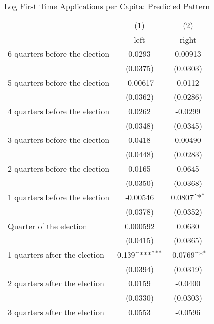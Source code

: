\begin{table}[htbp]\centering
\def\sym#1{\ifmmode^{#1}\else\(^{#1}\)\fi}
\caption{Log First Time Applications per Capita: Predicted Pattern}
\begin{tabular}{l*{2}{c}}
\hline\hline
                    &\multicolumn{1}{c}{(1)}&\multicolumn{1}{c}{(2)}\\
                    &\multicolumn{1}{c}{left}&\multicolumn{1}{c}{right}\\
\hline
 6 quarters before the election&      0.0293         &     0.00913         \\
                    &    (0.0375)         &    (0.0303)         \\
[1em]
 5 quarters before the election&    -0.00617         &      0.0112         \\
                    &    (0.0362)         &    (0.0286)         \\
[1em]
 4 quarters before the election&      0.0262         &     -0.0299         \\
                    &    (0.0348)         &    (0.0345)         \\
[1em]
 3 quarters before the election&      0.0418         &     0.00490         \\
                    &    (0.0448)         &    (0.0283)         \\
[1em]
 2 quarters before the election&      0.0165         &      0.0645         \\
                    &    (0.0350)         &    (0.0368)         \\
[1em]
 1 quarters before the election&    -0.00546         &      0.0807\sym{*}  \\
                    &    (0.0378)         &    (0.0352)         \\
[1em]
Quarter of the election&    0.000592         &      0.0630         \\
                    &    (0.0415)         &    (0.0365)         \\
[1em]
 1 quarters after the election&       0.139\sym{***}&     -0.0769\sym{*}  \\
                    &    (0.0394)         &    (0.0319)         \\
[1em]
 2 quarters after the election&      0.0159         &     -0.0400         \\
                    &    (0.0330)         &    (0.0303)         \\
[1em]
 3 quarters after the election&      0.0553         &     -0.0596         \\

\end{tabular}
\end{table}
